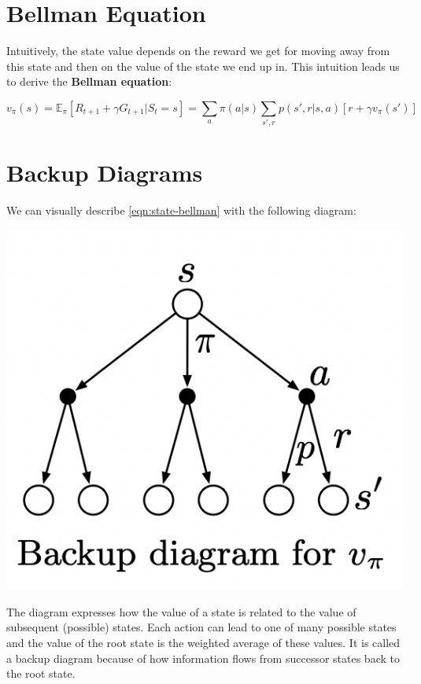 \documentclass[11pt]{report}
\begin{document}
\section{Bellman Equation}
Intuitively, the state value depends on the reward we get for moving away from this state and then on the value of the state we end up in. This intuition leads us to derive the \textbf{Bellman equation}:


\begin{equation}
	\label{eqn:state-bellman}
	v_\pi(s) = \mathbb{E}_\pi[R_{t+1} + \gamma G_{t+1} | S_t = s] = \sum_{a}\pi(a|s)\sum_{s',r}p(s',r|s,a)\left[r+\gamma v_\pi(s')\right]
\end{equation}

\section{Backup Diagrams}
We can visually describe \autoref{eqn:state-bellman} with the following diagram:

\begin{center}
	\includegraphics[scale=0.5]{images/state-backup.png}
\end{center}

The diagram expresses how the value of a state is related to the value of subsequent (possible) states. Each action can lead to one of many possible states and the value of the root state is the weighted average of these values. It is called a backup diagram because of how information flows from successor states back to the root state.
\end{document}
